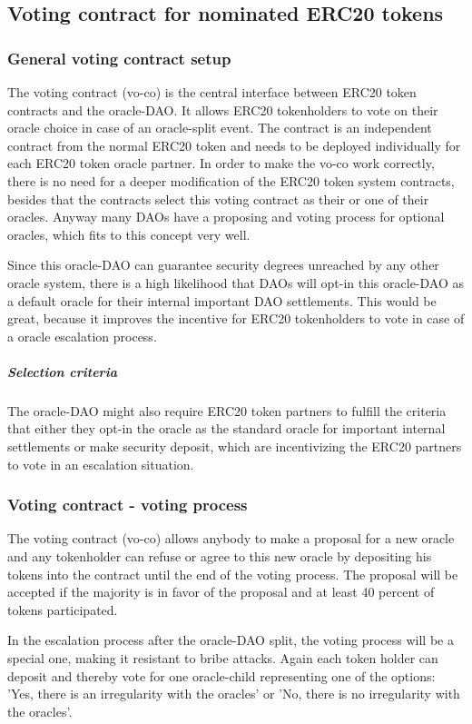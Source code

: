 \documentclass[a4paper]{article}
\begin{document}
\subsection{Voting contract for nominated ERC20 tokens}\label{ERC20tokenvoting}
\subsubsection*{General voting contract setup}
The voting contract (vo-co) is the central interface between ERC20 token contracts and the oracle-DAO. It allows ERC20 tokenholders to vote on their oracle choice in case of an oracle-split event. The contract is an independent contract from the normal ERC20 token and needs to be deployed individually for each ERC20 token oracle partner. In order to make the vo-co work correctly, there is no need for a deeper modification of the ERC20 token system contracts, besides that the contracts select this voting contract as their or one of their oracles. Anyway many DAOs have a proposing and voting process for optional oracles, which fits to this concept very well.

Since this oracle-DAO can guarantee security degrees unreached by any other oracle system, there is a high likelihood that DAOs will opt-in this oracle-DAO as a default oracle for their internal important DAO settlements. This would be great, because it improves the incentive for ERC20 tokenholders to vote in case of a oracle escalation process.
\subparagraph{Selection criteria}
\label{erc20selectioncriteria}
The oracle-DAO might also require ERC20 token partners to fulfill the criteria that either they opt-in the oracle as the standard oracle for important internal settlements or make security deposit, which are incentivizing the ERC20 partners to vote in an escalation situation.

\subsubsection*{Voting contract - voting process}
\label{votingprocess}The voting contract (vo-co) allows anybody to make a proposal for a new oracle and any tokenholder can refuse or agree to this new oracle by depositing his tokens into the contract until the end of the voting process. The proposal will be accepted if the majority is in favor of the proposal and at least 40 percent of tokens participated. 

In the escalation process after the oracle-DAO split, the voting process will be a special one, making it resistant to bribe attacks. Again each token holder can deposit and thereby vote for one oracle-child representing one of the options: 'Yes, there is an irregularity with the oracles' or 'No, there is no irregularity with the oracles'.
\end{document}
